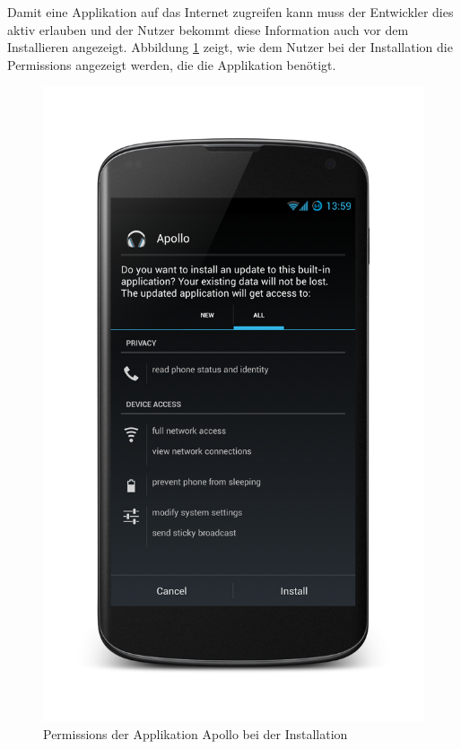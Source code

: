 Damit eine Applikation auf das Internet zugreifen kann muss der Entwickler dies aktiv erlauben und der Nutzer bekommt diese Information auch vor dem Installieren angezeigt. Abbildung \ref{permissions} zeigt, wie dem Nutzer bei der Installation die Permissions angezeigt werden, die die Applikation benötigt. 

\begin{figure}[ht!]
\begin{center}
\includegraphics[scale=0.2]{images/permissions}
\caption{Permissions der Applikation Apollo bei der Installation}
\label{permissions}
\end{center}
\end{figure}

